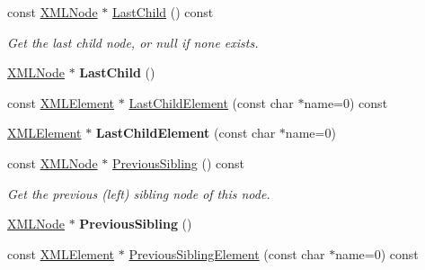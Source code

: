 \begin{DoxyCompactItemize}
\item 
\mbox{\label{classtinyxml2_1_1_x_m_l_node_a9b8583a277e8e26f4cbbb5492786778e}} 
const \hyperlink{classtinyxml2_1_1_x_m_l_node}{X\+M\+L\+Node} $\ast$ \hyperlink{classtinyxml2_1_1_x_m_l_node_a9b8583a277e8e26f4cbbb5492786778e}{Last\+Child} () const
\begin{DoxyCompactList}\small\item\em Get the last child node, or null if none exists. \end{DoxyCompactList}\item 
\mbox{\label{classtinyxml2_1_1_x_m_l_node_ad7552c8cb1dc0cb6f3bdc14a9d115dbf}} 
\hyperlink{classtinyxml2_1_1_x_m_l_node}{X\+M\+L\+Node} $\ast$ {\bfseries Last\+Child} ()
\item 
const \hyperlink{classtinyxml2_1_1_x_m_l_element}{X\+M\+L\+Element} $\ast$ \hyperlink{classtinyxml2_1_1_x_m_l_node_a609e02f02044f39b928d1a3e0de9f532}{Last\+Child\+Element} (const char $\ast$name=0) const
\item 
\mbox{\label{classtinyxml2_1_1_x_m_l_node_a1b77a8194d059665a4412ebfea276878}} 
\hyperlink{classtinyxml2_1_1_x_m_l_element}{X\+M\+L\+Element} $\ast$ {\bfseries Last\+Child\+Element} (const char $\ast$name=0)
\item 
\mbox{\label{classtinyxml2_1_1_x_m_l_node_aac667c513d445f8b783e1e15ef9d3551}} 
const \hyperlink{classtinyxml2_1_1_x_m_l_node}{X\+M\+L\+Node} $\ast$ \hyperlink{classtinyxml2_1_1_x_m_l_node_aac667c513d445f8b783e1e15ef9d3551}{Previous\+Sibling} () const
\begin{DoxyCompactList}\small\item\em Get the previous (left) sibling node of this node. \end{DoxyCompactList}\item 
\mbox{\label{classtinyxml2_1_1_x_m_l_node_ae760e5e7e766df1d2cf3bb4a847876d6}} 
\hyperlink{classtinyxml2_1_1_x_m_l_node}{X\+M\+L\+Node} $\ast$ {\bfseries Previous\+Sibling} ()
\item 
\mbox{\label{classtinyxml2_1_1_x_m_l_node_a9453cda5e970375a7b1b2099f8a7c40a}} 
const \hyperlink{classtinyxml2_1_1_x_m_l_element}{X\+M\+L\+Element} $\ast$ \hyperlink{classtinyxml2_1_1_x_m_l_node_a9453cda5e970375a7b1b2099f8a7c40a}{Previous\+Sibling\+Element} (const char $\ast$name=0) const

\end{DoxyCompactItemize}
